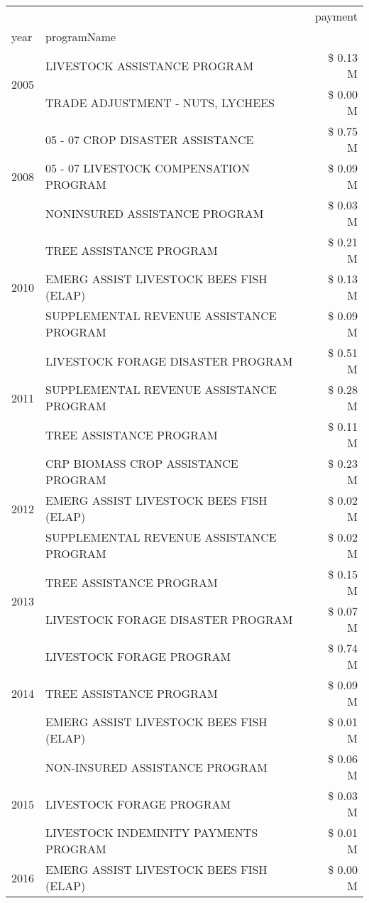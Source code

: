 \begin{tabular}{llr}
\toprule
 &  & payment \\
year & programName &  \\
\midrule
\multirow[t]{2}{*}{2005} & LIVESTOCK ASSISTANCE PROGRAM & \$ 0.13 M \\
 & TRADE ADJUSTMENT - NUTS, LYCHEES & \$ 0.00 M \\
\cline{1-3}
\multirow[t]{3}{*}{2008} & 05 - 07 CROP DISASTER ASSISTANCE & \$ 0.75 M \\
 & 05 - 07 LIVESTOCK COMPENSATION PROGRAM & \$ 0.09 M \\
 & NONINSURED ASSISTANCE PROGRAM & \$ 0.03 M \\
\cline{1-3}
\multirow[t]{3}{*}{2010} & TREE ASSISTANCE PROGRAM & \$ 0.21 M \\
 & EMERG ASSIST LIVESTOCK BEES FISH (ELAP) & \$ 0.13 M \\
 & SUPPLEMENTAL REVENUE ASSISTANCE PROGRAM & \$ 0.09 M \\
\cline{1-3}
\multirow[t]{3}{*}{2011} & LIVESTOCK FORAGE DISASTER PROGRAM & \$ 0.51 M \\
 & SUPPLEMENTAL REVENUE ASSISTANCE PROGRAM & \$ 0.28 M \\
 & TREE ASSISTANCE PROGRAM & \$ 0.11 M \\
\cline{1-3}
\multirow[t]{3}{*}{2012} & CRP BIOMASS CROP ASSISTANCE PROGRAM & \$ 0.23 M \\
 & EMERG ASSIST LIVESTOCK BEES FISH (ELAP) & \$ 0.02 M \\
 & SUPPLEMENTAL REVENUE ASSISTANCE PROGRAM & \$ 0.02 M \\
\cline{1-3}
\multirow[t]{2}{*}{2013} & TREE ASSISTANCE PROGRAM & \$ 0.15 M \\
 & LIVESTOCK FORAGE DISASTER PROGRAM & \$ 0.07 M \\
\cline{1-3}
\multirow[t]{3}{*}{2014} & LIVESTOCK FORAGE PROGRAM & \$ 0.74 M \\
 & TREE ASSISTANCE PROGRAM & \$ 0.09 M \\
 & EMERG ASSIST LIVESTOCK BEES FISH (ELAP) & \$ 0.01 M \\
\cline{1-3}
\multirow[t]{3}{*}{2015} & NON-INSURED ASSISTANCE PROGRAM & \$ 0.06 M \\
 & LIVESTOCK FORAGE PROGRAM & \$ 0.03 M \\
 & LIVESTOCK INDEMINITY PAYMENTS PROGRAM & \$ 0.01 M \\
\cline{1-3}
2016 & EMERG ASSIST LIVESTOCK BEES FISH (ELAP) & \$ 0.00 M \\
\cline{1-3}

\end{tabular}
